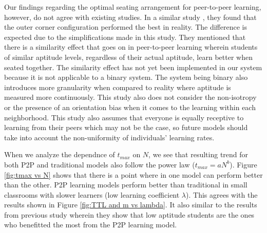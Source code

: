 \documentclass[10pt,a4paper,twoside]{article}
\begin{document}
\noindent Our findings regarding the optimal seating arrangement for peer-to-peer learning, however, do not agree with existing studies. In a similar study \cite{roxas2010seating}, they found that the outer corner configuration performed the best in reality. The difference is expected due to the simplifications made in this study. They mentioned that there is a similarity effect that goes on in peer-to-peer learning wherein students of similar aptitude levels, regardless of their actual aptitude, learn better when seated together. The similarity effect has not yet been implemented in our system because it is not applicable to a binary system. The system being binary also introduces more granularity when compared to reality where aptitude is measured more continuously. This study also does not consider the non-isotropy or the presence of an orientation bias when it comes to the learning within each neighborhood. This study also assumes that everyone is equally receptive to learning from their peers which may not be the case, so future models should take into account the non-uniformity of individuals’ learning rates.


\noindent When we analyze the dependnce of $t_{max}$ on $N$, we see that resulting trend for both P2P and traditional models also follow the power law ($t_{max}=aN^b$). Figure \ref{fig:tmax vs N} shows that there is a point where in one model can perform better than the other. P2P learning models perform better than traditional in small classrooms with slower learners (low learning coefficient $\lambda$). This agrees with the results shown in Figure \ref{fig:TTL and m vs lambda}. It also similar to the results from previous study \cite{roxas2010seating} wherein they show that low aptitude students are the ones who benefitted the most from the P2P learning model.
\end{document}
